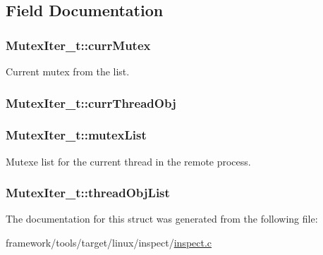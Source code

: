 \subsection{Field Documentation}
\subsubsection[{\texorpdfstring{curr\+Mutex}{currMutex}}]{ Mutex\+Iter\+\_\+t\+::curr\+Mutex}\hypertarget{struct_mutex_iter__t_a86753027db44dd235b1efe5f64e66034}{}\label{struct_mutex_iter__t_a86753027db44dd235b1efe5f64e66034}


Current mutex from the list. 

\subsubsection[{\texorpdfstring{curr\+Thread\+Obj}{currThreadObj}}]{ Mutex\+Iter\+\_\+t\+::curr\+Thread\+Obj}\hypertarget{struct_mutex_iter__t_ad74a6a57c574765d3c1970fd2104186a}{}\label{struct_mutex_iter__t_ad74a6a57c574765d3c1970fd2104186a}
\subsubsection[{\texorpdfstring{mutex\+List}{mutexList}}]{ Mutex\+Iter\+\_\+t\+::mutex\+List}\hypertarget{struct_mutex_iter__t_a1649f4f2371f6fd4e47455343b99a001}{}\label{struct_mutex_iter__t_a1649f4f2371f6fd4e47455343b99a001}


Mutexe list for the current thread in the remote process. 

\subsubsection[{\texorpdfstring{thread\+Obj\+List}{threadObjList}}]{ Mutex\+Iter\+\_\+t\+::thread\+Obj\+List}\hypertarget{struct_mutex_iter__t_ae8248a98b57faad0385f542390bcf32e}{}\label{struct_mutex_iter__t_ae8248a98b57faad0385f542390bcf32e}


The documentation for this struct was generated from the following file\+:\begin{DoxyCompactItemize}
\item 
framework/tools/target/linux/inspect/\hyperlink{inspect_8c}{inspect.\+c}\end{DoxyCompactItemize}
